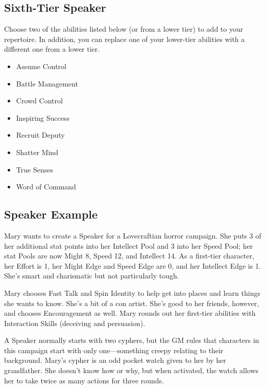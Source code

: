\subsection{Sixth-Tier Speaker}

Choose two of the abilities listed below (or from a lower tier) to add to your repertoire. In addition, you can replace one of your lower-tier abilities with a different one from a lower tier.

\begin{itemize} 
\item Assume Control
\item Battle Management
\item Crowd Control
\item Inspiring Success
\item Recruit Deputy
\item Shatter Mind
\item True Senses
\item Word of Command
\end{itemize}

\subsection{Speaker Example}

Mary wants to create a Speaker for a Lovecraftian horror campaign. She puts 3 of her additional stat points into her Intellect Pool and 3 into her Speed Pool; her stat Pools are now Might 8, Speed 12, and Intellect 14. As a first-tier character, her Effort is 1, her Might Edge and Speed Edge are 0, and her Intellect Edge is 1. She’s smart and charismatic but not particularly tough.

Mary chooses Fast Talk and Spin Identity to help get into places and learn things she wants to know. She’s a bit of a con artist. She’s good to her friends, however, and chooses Encouragement as well. Mary rounds out her first-tier abilities with Interaction Skills (deceiving and persuasion).

A Speaker normally starts with two cyphers, but the GM rules that characters in this campaign start with only one—something creepy relating to their background. Mary’s cypher is an odd pocket watch given to her by her grandfather. She doesn’t know how or why, but when activated, the watch allows her to take twice as many actions for three rounds.

